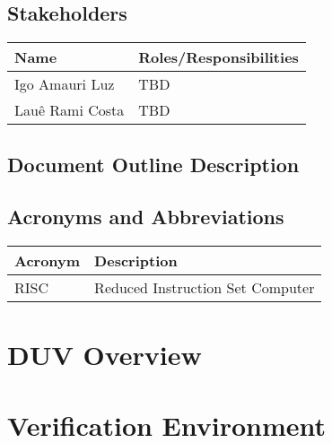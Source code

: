 \documentclass{article}
\begin{document}
	\subsection{Stakeholders}
  \FloatBarrier
  \begin{table}[H] 
    \begin{center}
      \begin{tabular}[pos]{|m{5cm} | m{8cm}|} 
        \hline %
        \cellcolor[gray]{0.9}\textbf{Name} & \cellcolor[gray]{0.9}\textbf{Roles/Responsibilities} \\ \hline
        Igo Amauri Luz & TBD \\ \hline
        Lauê Rami Costa & TBD \\ \hline
      \end{tabular}
    \end{center}
  \end{table} 
  
  \subsection{Document Outline Description}	
  
  \subsection{Acronyms and Abbreviations}
  \FloatBarrier
  \begin{table}[H]
    \begin{center}
      \begin{tabular}[pos]{|m{2cm} | m{9cm}|} 
				\hline 
				\cellcolor[gray]{0.9}\textbf{Acronym} & \cellcolor[gray]{0.9}\textbf{Description} \\ \hline
				RISC & Reduced Instruction Set Computer \\ \hline
      \end{tabular}
    \end{center}
  \end{table}  

	\section{DUV Overview}
	
	\section{Verification Environment}
	
\end{document}
